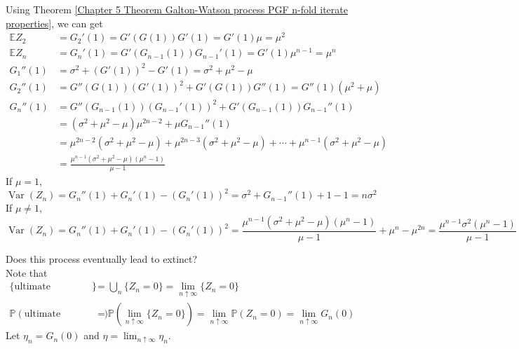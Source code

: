 \documentclass{huhtakm-template-book}
\newcommand{\prob}{\mathbb{P}}
\newcommand{\expect}{\mathbb{E}}
\DeclareMathOperator{\Var}{Var}
\begin{document}
\begin{proofing}
	Using Theorem \ref{Chapter 5 Theorem Galton-Watson process PGF n-fold iterate properties}, we can get
	\begin{align*}
		\expect Z_{2}&=G_{2}'(1)=G'(G(1))G'(1)=G'(1)\mu=\mu^{2}\\
		\expect Z_{n}&=G_{n}'(1)=G'(G_{n-1}(1))G_{n-1}'(1)=G'(1)\mu^{n-1}=\mu^{n}\\
		G_{1}''(1)&=\sigma^{2}+(G'(1))^{2}-G'(1)=\sigma^{2}+\mu^{2}-\mu\\
		G_{2}''(1)&=G''(G(1))(G'(1))^{2}+G'(G(1))G''(1)=G''(1)(\mu^{2}+\mu)\\
		G_{n}''(1)&=G''(G_{n-1}(1))(G_{n-1}'(1))^{2}+G'(G_{n-1}(1))G_{n-1}''(1)\\
		&=(\sigma^{2}+\mu^{2}-\mu)\mu^{2n-2}+\mu G_{n-1}''(1)\\
		&=\mu^{2n-2}(\sigma^{2}+\mu^{2}-\mu)+\mu^{2n-3}(\sigma^{2}+\mu^{2}-\mu)+\cdots+\mu^{n-1}(\sigma^{2}+\mu^{2}-\mu)\\
		&=\frac{\mu^{n-1}(\sigma^{2}+\mu^{2}-\mu)(\mu^{n}-1)}{\mu-1}
	\end{align*}
	If $\mu=1$,
	\begin{equation*}
		\Var(Z_{n})=G_{n}''(1)+G_{n}'(1)-(G_{n}'(1))^{2}=\sigma^{2}+G_{n-1}''(1)+1-1=n\sigma^{2}
	\end{equation*}
	If $\mu\neq 1$,
	\begin{equation*}
		\Var(Z_{n})=G_{n}''(1)+G_{n}'(1)-(G_{n}'(1))^{2}=\frac{\mu^{n-1}(\sigma^{2}+\mu^{2}-\mu)(\mu^{n}-1)}{\mu-1}+\mu^{n}-\mu^{2n}=\frac{\mu^{n-1}\sigma^{2}(\mu^{n}-1)}{\mu-1}
	\end{equation*}
\end{proofing}
\begin{eg}
	Does this process eventually lead to extinct?\\
	Note that
	\begin{align*}
		\{\text{ultimate extinction}\}&=\bigcup_{n}\{Z_{n}=0\}=\lim_{n\uparrow\infty}\{Z_{n}=0\}\\
		\prob(\text{ultimate extinction})&=\prob\left(\lim_{n\uparrow\infty}\{Z_{n}=0\}\right)=\lim_{n\uparrow\infty}\prob(Z_{n}=0)=\lim_{n\uparrow\infty}G_{n}(0)
	\end{align*}
	Let $\eta_{n}=G_{n}(0)$ and $\eta=\lim_{n\uparrow\infty}\eta_{n}$.
\end{eg}
\end{document}
